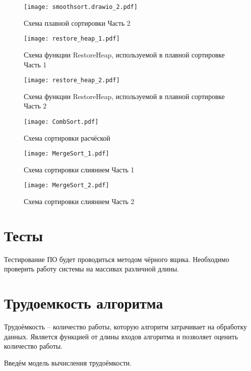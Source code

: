        	\begin{figure}[h!]
            \centering
            \texttt{[image: smoothsort.drawio\_2.pdf]}
            \caption{Схема плавной сортировки Часть 2}
            \label{schema:SmoothSort_2}
        \end{figure}\clearpage

        \begin{figure}[h!]
            \centering
            \texttt{[image: restore\_heap\_1.pdf]}
            \caption{Схема функции RestoreHeap, используемой в плавной сортировке Часть 1}
        \end{figure}\clearpage

        \begin{figure}[h!]
            \centering
            \texttt{[image: restore\_heap\_2.pdf]}
            \caption{Схема функции RestoreHeap, используемой в плавной сортировке Часть 2}
        \end{figure}\clearpage
        
            \begin{figure}[h!]
            \centering
            \texttt{[image: CombSort.pdf]}
            \caption{Схема сортировки расчёской}
            \label{schema:CombSort}
        \end{figure}\clearpage

            \begin{figure}[h!]
            \centering
            \texttt{[image: MergeSort\_1.pdf]}
            \caption{Схема сортировки слиянием Часть 1}
            \label{schema:MergeSort}
        \end{figure}\clearpage

            \begin{figure}[h!]
            \centering
            \texttt{[image: MergeSort\_2.pdf]}
            \caption{Схема сортировки слиянием Часть 2}
        \end{figure}\clearpage

    \section{Тесты}
    Тестирование ПО будет проводиться методом чёрного ящика. Необходимо проверить работу системы 
    на массивах различной длины.
  	
    \section{Трудоемкость алгоритма}
    \par Трудоёмкость – количество работы, которую алгоритм затрачивает на обработку данных. Является функцией от длины входов алгоритма и позволяет оценить количество работы.
    \par Введём модель вычисления трудоёмкости.

